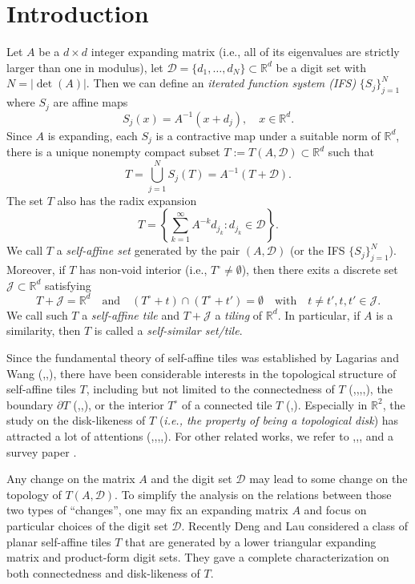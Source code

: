 \documentclass[12pt, reqno]{amsart}
\numberwithin{equation}{section}
\begin{document}
\section{\bf Introduction}
Let $A$ be a $d\times d$ integer expanding matrix (i.e., all of its eigenvalues are strictly larger than one in modulus), let ${\mathcal D}=\{d_1,\dots,d_N\}\subset {\mathbb R}^d$ be a digit set with $N=|\det(A)|$. Then we can define an {\it iterated function system (IFS)} $\{S_{j}\}_{j=1}^{N}$ where $S_j$ are affine maps
\[
S_{j}(x)=A^{-1}(x+d_{j}),  \quad x\in\mathbb{R}^d.
\]
Since $A$ is expanding, each $S_{j}$ is a contractive map under a suitable norm \cite{LaWa} of $\mathbb{R}^{d}$, there is a unique nonempty compact subset $T:=T(A,{\mathcal D})\subset{\mathbb{R}}^d$  \cite{Hu}  such that
$$T=\bigcup_{j=1}^NS_j(T)=A^{-1}(T+{\mathcal D}).$$
The set $T$ also has the radix expansion
\begin{equation}\label{eq1.1}
T=\left\{\sum^{\infty}_{k=1}A^{-k}d_{j_k}:d_{j_k}\in\mathcal{D}\right\}.
\end{equation}
We call $T$ a {\it self-affine set} generated by the pair $(A, {\mathcal D})$ (or the IFS $\{S_{j}\}_{j=1}^{N}$). Moreover, if $T$ has non-void interior (i.e., $T^\circ\ne\emptyset$), then there exits a discrete set ${\mathcal J}\subset {\mathbb R}^d$ satisfying $$T+{\mathcal J}={\mathbb R}^d \quad \text{and}\quad (T^\circ+t)\cap (T^\circ +t')=\emptyset \quad \text{with}\quad t\ne t', t,t'\in {\mathcal J}.$$
We call such $T$ a {\it self-affine tile} and $T+{\mathcal J}$ a {\it tiling} of ${\mathbb R}^d$. In particular, if $A$ is a similarity, then $T$ is called a {\it self-similar set/tile}.

Since the fundamental theory of self-affine tiles was established by Lagarias and Wang (\cite{LaWa},\cite{LaWa1},\cite{LaWa2}), there have been considerable interests in the topological structure of self-affine tiles $T$,  including but not limited to the connectedness of  $T$ (\cite{GrHa},\cite{HaSaVe},\cite{KiLa},\cite{AkGj},\cite{DeLa}),  the boundary $\partial T$ (\cite{AL},\cite{LeLu3},\cite{LAT}), or the interior $T^\circ$ of a connected tile $T$  (\cite{NT},\cite{NT2}). Especially in $\mathbb{R}^2$, the study on the disk-likeness of $T$   ({\it i.e., the property of being a topological disk}) has attracted a lot of attentions  (\cite{BaWa},\cite{LeLa},\cite{LRT},\cite{Ki},\cite{DeLa}). For other related works, we refer to \cite{LLY},\cite{LeLu},\cite{LeLu2},\cite{LLX}
 and a survey paper \cite{AT}.

Any change on the matrix $A$ and the digit set $\mathcal{D}$ may lead to some change on the topology of $T(A,\mathcal{D})$. To simplify the analysis on the relations between those two types of ``changes'', one may fix an expanding matrix $A$ and focus on particular choices of the digit set $\mathcal{D}$. Recently Deng and Lau \cite{DeLa} considered a class of planar self-affine tiles $T$ that are generated by a lower triangular expanding matrix and  product-form digit sets. They gave a complete characterization on both connectedness and disk-likeness of $T$.
\end{document}
